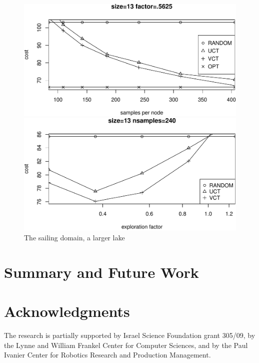 \documentclass{article}
\begin{document}
\begin{figure}[t]
  \begin{minipage}[b]{0.5\linewidth} \centering
    \includegraphics[scale=0.45,trim=0pt 0pt 0pt
    0pt,clip]{sailing-size=13-factor=_5625.pdf}
  \end{minipage}
  \begin{minipage}[b]{0.5\linewidth} \centering
    \includegraphics[scale=0.45,trim=0pt 0pt 0pt
    0pt,clip]{sailing-size=13-nsamples=240.pdf}
  \end{minipage}
  \caption{The sailing domain, a larger lake}
  \label{fig:sailing-13}
\end{figure}

\section{Summary and Future Work}

\section*{Acknowledgments}

The research is partially supported by Israel
Science Foundation grant 305/09, by the Lynne and William Frankel
Center for Computer Sciences, and by the Paul Ivanier Center for
Robotics Research and Production Management.
\end{document}
